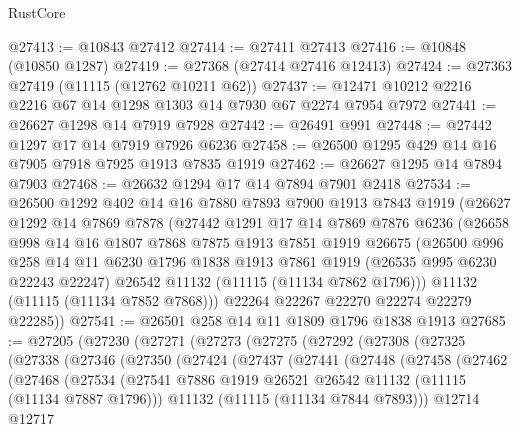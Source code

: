 \begin{lexlean}{RustCore}
\begin{coremodule}
@27413 := @10843 @27412
@27414 := @27411 @27413
@27416 := @10848 (@10850 @1287)
@27419 := @27368 (@27414 @27416 @12413)
@27424 := @27363 @27419 (@11115 (@12762 @10211 @62))
@27437 := @12471 @10212 @2216 @2216 @67 @14 @1298 @1303 @14 @7930 @67 @2274 @7954 @7972
@27441 := @26627 @1298 @14 @7919 @7928
@27442 := @26491 @991
@27448 := @27442 @1297 @17 @14 @7919 @7926 @6236
@27458 := @26500 @1295 @429 @14 @16 @7905 @7918 @7925 @1913 @7835 @1919
@27462 := @26627 @1295 @14 @7894 @7903
@27468 := @26632 @1294 @17 @14 @7894 @7901 @2418
@27534 := @26500
    @1292
    @402
    @14
    @16
    @7880
    @7893
    @7900
    @1913
    @7843
    @1919
    (@26627
      @1292
      @14
      @7869
      @7878
      (@27442
        @1291
        @17
        @14
        @7869
        @7876
        @6236
        (@26658
          @998
          @14
          @16
          @1807
          @7868
          @7875
          @1913
          @7851
          @1919
          @26675
          (@26500
            @996
            @258
            @14
            @11
            @6230
            @1796
            @1838
            @1913
            @7861
            @1919
            (@26535 @995 @6230 @22243 @22247)
            @26542
            @11132
            (@11115 (@11134 @7862 @1796)))
          @11132
          (@11115 (@11134 @7852 @7868)))
        @22264
        @22267
        @22270
        @22274
        @22279
        @22285))
@27541 := @26501 @258 @14 @11 @1809 @1796 @1838 @1913
@27685 := @27205
    (@27230
      (@27271
        (@27273
          (@27275
            (@27292
              (@27308
                (@27325
                  (@27338
                    (@27346
                      (@27350
                        (@27424
                          (@27437
                            (@27441
                              (@27448
                                (@27458
                                  (@27462
                                    (@27468
                                      (@27534
                                        (@27541
                                          @7886
                                          @1919
                                          @26521
                                          @26542
                                          @11132
                                          (@11115 (@11134 @7887 @1796)))
                                        @11132
                                        (@11115 (@11134 @7844 @7893)))
                                      @12714
                                      @12717

\end{coremodule}
\end{lexlean}
